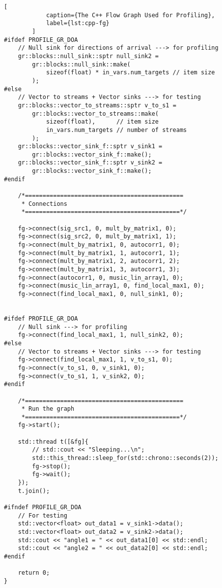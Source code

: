 \begin{lstlisting}[
		    caption={The C++ Flow Graph Used for Profiling},
		    label={lst:cpp-fg}
		]
#ifdef PROFILE_GR_DOA    
    // Null sink for directions of arrival ---> for profiling
    gr::blocks::null_sink::sptr null_sink2 = 
        gr::blocks::null_sink::make(
            sizeof(float) * in_vars.num_targets // item size
        );
#else
    // Vector to streams + Vector sinks ---> for testing
    gr::blocks::vector_to_streams::sptr v_to_s1 = 
        gr::blocks::vector_to_streams::make(
            sizeof(float),      // item size
            in_vars.num_targets // number of streams
        );
    gr::blocks::vector_sink_f::sptr v_sink1 = 
        gr::blocks::vector_sink_f::make();
    gr::blocks::vector_sink_f::sptr v_sink2 = 
        gr::blocks::vector_sink_f::make();
#endif
   
    /*=============================================
     * Connections
     *============================================*/

    fg->connect(sig_src1, 0, mult_by_matrix1, 0);
    fg->connect(sig_src2, 0, mult_by_matrix1, 1);
    fg->connect(mult_by_matrix1, 0, autocorr1, 0);
    fg->connect(mult_by_matrix1, 1, autocorr1, 1);
    fg->connect(mult_by_matrix1, 2, autocorr1, 2);
    fg->connect(mult_by_matrix1, 3, autocorr1, 3);
    fg->connect(autocorr1, 0, music_lin_array1, 0);
    fg->connect(music_lin_array1, 0, find_local_max1, 0);
    fg->connect(find_local_max1, 0, null_sink1, 0);
   
    
#ifdef PROFILE_GR_DOA    
    // Null sink ---> for profiling
    fg->connect(find_local_max1, 1, null_sink2, 0);
#else     
    // Vector to streams + Vector sinks ---> for testing
    fg->connect(find_local_max1, 1, v_to_s1, 0);
    fg->connect(v_to_s1, 0, v_sink1, 0);
    fg->connect(v_to_s1, 1, v_sink2, 0);
#endif

    /*=============================================
     * Run the graph
     *============================================*/
    fg->start();

    std::thread t([&fg]{
        // std::cout << "Sleeping...\n";
        std::this_thread::sleep_for(std::chrono::seconds(2));
        fg->stop();
        fg->wait();
    });
    t.join();

#ifndef PROFILE_GR_DOA    
    // For testing
    std::vector<float> out_data1 = v_sink1->data();
    std::vector<float> out_data2 = v_sink2->data();
    std::cout << "angle1 = " << out_data1[0] << std::endl;
    std::cout << "angle2 = " << out_data2[0] << std::endl;
#endif

    return 0;
}
		\end{lstlisting}
	
